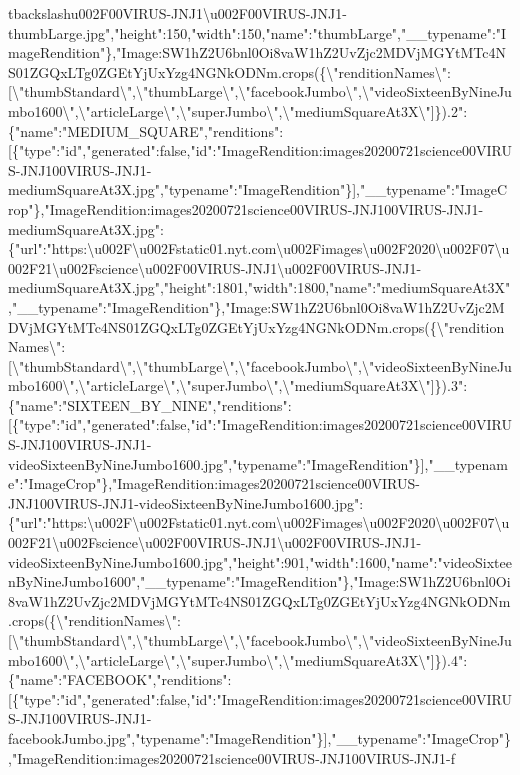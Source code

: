 tbackslash{}u002F00VIRUS-JNJ1\textbackslash{}u002F00VIRUS-JNJ1-thumbLarge.jpg","height":150,"width":150,"name":"thumbLarge","\_\_typename":"ImageRendition"\},"Image:SW1hZ2U6bnl0Oi8vaW1hZ2UvZjc2MDVjMGYtMTc4NS01ZGQxLTg0ZGEtYjUxYzg4NGNkODNm.crops(\{\textbackslash{}"renditionNames\textbackslash{}":{[}\textbackslash{}"thumbStandard\textbackslash{}",\textbackslash{}"thumbLarge\textbackslash{}",\textbackslash{}"facebookJumbo\textbackslash{}",\textbackslash{}"videoSixteenByNineJumbo1600\textbackslash{}",\textbackslash{}"articleLarge\textbackslash{}",\textbackslash{}"superJumbo\textbackslash{}",\textbackslash{}"mediumSquareAt3X\textbackslash{}"{]}\}).2":\{"name":"MEDIUM\_SQUARE","renditions":{[}\{"type":"id","generated":false,"id":"ImageRendition:images20200721science00VIRUS-JNJ100VIRUS-JNJ1-mediumSquareAt3X.jpg","typename":"ImageRendition"\}{]},"\_\_typename":"ImageCrop"\},"ImageRendition:images20200721science00VIRUS-JNJ100VIRUS-JNJ1-mediumSquareAt3X.jpg":\{"url":"https:\textbackslash{}u002F\textbackslash{}u002Fstatic01.nyt.com\textbackslash{}u002Fimages\textbackslash{}u002F2020\textbackslash{}u002F07\textbackslash{}u002F21\textbackslash{}u002Fscience\textbackslash{}u002F00VIRUS-JNJ1\textbackslash{}u002F00VIRUS-JNJ1-mediumSquareAt3X.jpg","height":1801,"width":1800,"name":"mediumSquareAt3X","\_\_typename":"ImageRendition"\},"Image:SW1hZ2U6bnl0Oi8vaW1hZ2UvZjc2MDVjMGYtMTc4NS01ZGQxLTg0ZGEtYjUxYzg4NGNkODNm.crops(\{\textbackslash{}"renditionNames\textbackslash{}":{[}\textbackslash{}"thumbStandard\textbackslash{}",\textbackslash{}"thumbLarge\textbackslash{}",\textbackslash{}"facebookJumbo\textbackslash{}",\textbackslash{}"videoSixteenByNineJumbo1600\textbackslash{}",\textbackslash{}"articleLarge\textbackslash{}",\textbackslash{}"superJumbo\textbackslash{}",\textbackslash{}"mediumSquareAt3X\textbackslash{}"{]}\}).3":\{"name":"SIXTEEN\_BY\_NINE","renditions":{[}\{"type":"id","generated":false,"id":"ImageRendition:images20200721science00VIRUS-JNJ100VIRUS-JNJ1-videoSixteenByNineJumbo1600.jpg","typename":"ImageRendition"\}{]},"\_\_typename":"ImageCrop"\},"ImageRendition:images20200721science00VIRUS-JNJ100VIRUS-JNJ1-videoSixteenByNineJumbo1600.jpg":\{"url":"https:\textbackslash{}u002F\textbackslash{}u002Fstatic01.nyt.com\textbackslash{}u002Fimages\textbackslash{}u002F2020\textbackslash{}u002F07\textbackslash{}u002F21\textbackslash{}u002Fscience\textbackslash{}u002F00VIRUS-JNJ1\textbackslash{}u002F00VIRUS-JNJ1-videoSixteenByNineJumbo1600.jpg","height":901,"width":1600,"name":"videoSixteenByNineJumbo1600","\_\_typename":"ImageRendition"\},"Image:SW1hZ2U6bnl0Oi8vaW1hZ2UvZjc2MDVjMGYtMTc4NS01ZGQxLTg0ZGEtYjUxYzg4NGNkODNm.crops(\{\textbackslash{}"renditionNames\textbackslash{}":{[}\textbackslash{}"thumbStandard\textbackslash{}",\textbackslash{}"thumbLarge\textbackslash{}",\textbackslash{}"facebookJumbo\textbackslash{}",\textbackslash{}"videoSixteenByNineJumbo1600\textbackslash{}",\textbackslash{}"articleLarge\textbackslash{}",\textbackslash{}"superJumbo\textbackslash{}",\textbackslash{}"mediumSquareAt3X\textbackslash{}"{]}\}).4":\{"name":"FACEBOOK","renditions":{[}\{"type":"id","generated":false,"id":"ImageRendition:images20200721science00VIRUS-JNJ100VIRUS-JNJ1-facebookJumbo.jpg","typename":"ImageRendition"\}{]},"\_\_typename":"ImageCrop"\},"ImageRendition:images20200721science00VIRUS-JNJ100VIRUS-JNJ1-f